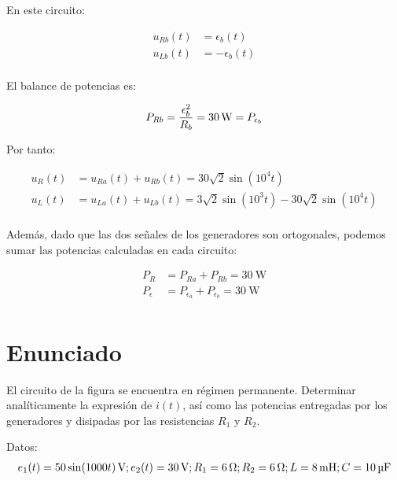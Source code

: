En este circuito:

\begin{align*}
  u_{Rb}(t) &= \epsilon_b(t)\\
  u_{Lb}(t) &= -\epsilon_b(t)\\  
\end{align*}

El balance de potencias es:

\begin{equation*}
  P_{Rb} = \frac{\epsilon_b^2}{R_b} = \qty{30}{\watt} = P_{\epsilon_b}\\
\end{equation*}

Por tanto:

\begin{align*}
  u_R(t) &= u_{Ra}(t) + u_{Rb}(t) = 30\sqrt{2}\sin(10^4 t)\\
  u_L(t) &= u_{La}(t) + u_{Lb}(t) = 3\sqrt{2}\sin(10^3 t) - 30\sqrt{2}\sin(10^4 t)\\
\end{align*}

Además, dado que las dos señales de los generadores son ortogonales, podemos sumar las potencias calculadas en cada circuito:

\begin{align*}
  P_R &= P_{Ra} + P_{Rb} = \qty{30}{\watt}\\
  P_\epsilon &= P_{\epsilon_a} + P_{\epsilon_b} = \qty{30}{\watt}\\
\end{align*}


\section{Enunciado}
El circuito de la figura se encuentra en régimen permanente. Determinar analíticamente la expresión de $i(t)$, así como las potencias entregadas por los generadores y disipadas por las resistencias $R_1$ y $R_2$.

Datos:
\begin{align*}
  e_1(t) = \qty[parse-numbers=false]{50 \sin(1000 t)}{\volt};
  e_2(t) = \qty{30}{\volt};
  R_1 = \qty{6}{\ohm};
  R_2 = \qty{6}{\ohm};
  L = \qty{8}{\milli\henry};
  C = \qty{10}{\micro\farad}
\end{align*}

